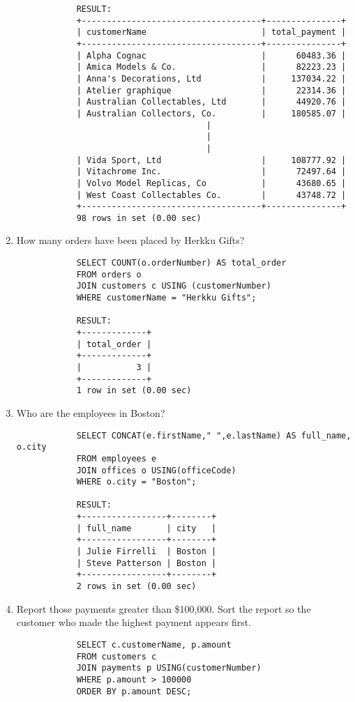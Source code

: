 \documentclass{article}
\begin{document}
\begin{enumerate}
\begin{verbatim}
			RESULT:
			+------------------------------------+---------------+
			| customerName                       | total_payment |
			+------------------------------------+---------------+
			| Alpha Cognac                       |      60483.36 |
			| Amica Models & Co.                 |      82223.23 |
			| Anna's Decorations, Ltd            |     137034.22 |
			| Atelier graphique                  |      22314.36 |
			| Australian Collectables, Ltd       |      44920.76 |
			| Australian Collectors, Co.         |     180585.07 |
			                          |
			                          |
			                          |
			| Vida Sport, Ltd                    |     108777.92 |
			| Vitachrome Inc.                    |      72497.64 |
			| Volvo Model Replicas, Co           |      43680.65 |
			| West Coast Collectables Co.        |      43748.72 |
			+------------------------------------+---------------+
			98 rows in set (0.00 sec)
			\end{verbatim}
		\item How many orders have been placed by Herkku Gifts?
			\begin{verbatim}
			SELECT COUNT(o.orderNumber) AS total_order
			FROM orders o
			JOIN customers c USING (customerNumber)
			WHERE customerName = "Herkku Gifts";
			
			RESULT:
			+-------------+
			| total_order |
			+-------------+
			|           3 |
			+-------------+
			1 row in set (0.00 sec)
			\end{verbatim}
		\item Who are the employees in Boston?
			\begin{verbatim}
			SELECT CONCAT(e.firstName," ",e.lastName) AS full_name, o.city
			FROM employees e
			JOIN offices o USING(officeCode)
			WHERE o.city = "Boston";
			
			RESULT:
			+-----------------+--------+
			| full_name       | city   |
			+-----------------+--------+
			| Julie Firrelli  | Boston |
			| Steve Patterson | Boston |
			+-----------------+--------+
			2 rows in set (0.00 sec)
			\end{verbatim}
		\item Report those payments greater than \$100,000. Sort the report so the customer who made the highest payment appears first.
			\begin{verbatim}
			SELECT c.customerName, p.amount
			FROM customers c
			JOIN payments p USING(customerNumber)
			WHERE p.amount > 100000
			ORDER BY p.amount DESC;
			

\end{verbatim}
\end{enumerate}
\end{document}
